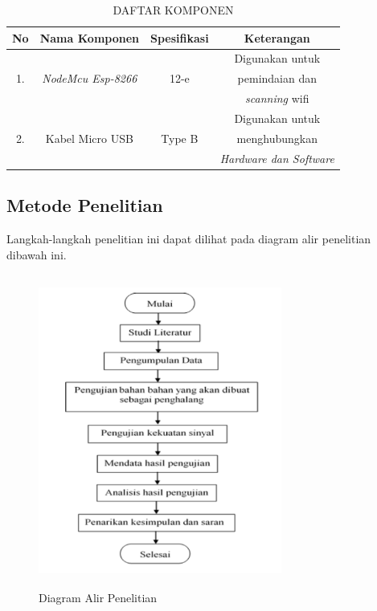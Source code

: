 \documentclass[conference]{IEEEtran}
\begin{document}
\begin{table}[htbp]
        \caption{DAFTAR KOMPONEN}
        \label{tab5}
        \centering
        \begin{tabular}{|c|c|c|c|}
        \hline
        \textbf{No} & \textbf{Nama Komponen} & \textbf{Spesifikasi}& \textbf{Keterangan} \\
        \hline
        \multirow{3}{*}{1.} & \multirow{3}{*}{\textit{NodeMcu Esp-8266}} & \multirow{3}{*}{12-e} & Digunakan untuk \\
        & & & pemindaian dan \\
        & & & \textit{scanning} wifi \\
        \hline
         \multirow{3}{*}{2.} & \multirow{3}{*}{Kabel Micro USB} & \multirow{3}{*}{Type B} & Digunakan untuk \\ 
        & & & menghubungkan \\
        & & & \textit{Hardware dan Software} \\
        \hline
        \end{tabular}
\end{table}

\subsection{Metode Penelitian}
Langkah-langkah penelitian ini dapat dilihat pada diagram alir penelitian
dibawah ini.\\

\begin{figure}[htbp]
\centerline{\includegraphics[width=8cm, height=10.3cm]{gambar.png}}
\caption{Diagram Alir Penelitian}
\label{fig}
\end{figure}
\end{document}
